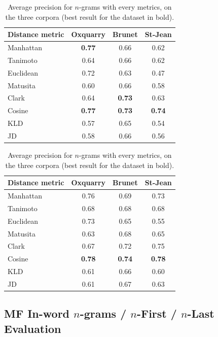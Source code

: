 \begin{table}
  \centering
  \caption{Average precision for $n$-grams with every metrics, on the three corpora (best result for the dataset in bold).}
  \label{tab:letter_ngrams}

  \begin{tabular}{l c c c}
    \toprule
    Distance metric & Oxquarry & Brunet & St-Jean \\
    \midrule
    Manhattan & \textbf{0.77} & 0.66 & 0.62 \\
    Tanimoto & 0.64 & 0.66 & 0.62 \\
    Euclidean & 0.72 & 0.63 & 0.47 \\
    Matusita & 0.60 & 0.66 & 0.58 \\
    Clark & 0.64 & \textbf{0.73} & 0.63 \\
    Cosine & \textbf{0.77} & \textbf{0.73} & \textbf{0.74} \\
    KLD & 0.57 & 0.65 & 0.54 \\
    JD & 0.58 & 0.66 & 0.56 \\
    \bottomrule
  \end{tabular}

  \vspace{0.5cm}

  \begin{tabular}{l c c c}
    \toprule
    Distance metric & Oxquarry & Brunet & St-Jean \\
    \midrule
    Manhattan & 0.76 & 0.69 & 0.73 \\
    Tanimoto & 0.68 & 0.68 & 0.68 \\
    Euclidean & 0.73 & 0.65 & 0.55 \\
    Matusita & 0.63 & 0.68 & 0.65 \\
    Clark & 0.67 & 0.72 & 0.75 \\
    Cosine & \textbf{0.78} & \textbf{0.74} & \textbf{0.78} \\
    KLD & 0.61 & 0.66 & 0.60 \\
    JD & 0.61 & 0.67 & 0.63 \\
    \bottomrule
  \end{tabular}
\end{table}

\subsection{MF In-word $n$-grams / $n$-First / $n$-Last Evaluation}

